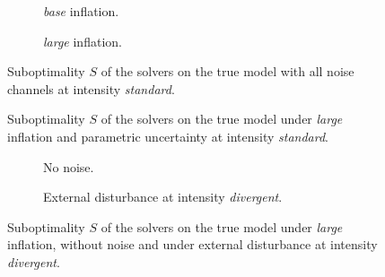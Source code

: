 \begin{figure}[htbp]
  \centering
  \begin{subfigure}[t]{0.49\linewidth}
    \centering
    \caption{\emph{base} inflation.}
    \label{fig:ch4-true-noise-base-all-standard}
  \end{subfigure}\hfill
  \begin{subfigure}[t]{0.49\linewidth}
    \centering
    \caption{\emph{large} inflation.}
    \label{fig:ch4-true-noise-large-all-standard}
  \end{subfigure}
  \caption{Suboptimality $S$ of the solvers on the true model with all noise channels at
    intensity \emph{standard}.}
  \label{fig:ch4-true-noise-all-standard}
\end{figure}



\begin{figure}[htbp]
  \centering
  \caption{Suboptimality $S$ of the solvers on the true model under \emph{large} inflation
    and parametric uncertainty at intensity \emph{standard}.}
  \label{fig:ch4-true-noise-large-parametric-standard}
\end{figure}

\begin{figure}[htbp]
  \centering
  \begin{subfigure}[t]{0.49\linewidth}
    \centering
    \caption{No noise.}
    \label{fig:ch4-true-noise-large-clean-disturbance}
  \end{subfigure}\hfill
  \begin{subfigure}[t]{0.49\linewidth}
    \centering
    \caption{External disturbance at intensity \emph{divergent}.}
    \label{fig:ch4-true-noise-large-disturbance-divergent}
  \end{subfigure}
  \caption{Suboptimality $S$ of the solvers on the true model under \emph{large} inflation,
    without noise and under external disturbance at intensity \emph{divergent}.}
  \label{fig:ch4-true-noise-large-disturbance}
\end{figure}


